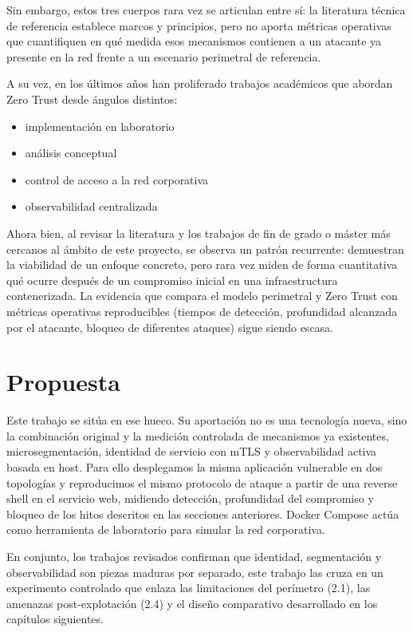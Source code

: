 \documentclass[11pt,spanish,listoffigures,listoftables]{tfgetsinf}
\begin{document}
    Sin embargo, estos tres cuerpos rara vez se articulan entre sí: la literatura técnica de referencia establece marcos y principios, pero no aporta métricas operativas que cuantifiquen en qué medida esos mecanismos contienen a un atacante ya presente en la red frente a un escenario perimetral de referencia.
    
    A su vez, en los últimos años han proliferado trabajos académicos que abordan Zero Trust desde ángulos distintos: 
    \begin{itemize}
        \item implementación en laboratorio
        \item análisis conceptual
        \item control de acceso a la red corporativa
        \item observabilidad centralizada
    \end{itemize}
    
    Ahora bien, al revisar la literatura y los trabajos de fin de grado o máster más cercanos al ámbito de este proyecto, se observa un patrón recurrente: demuestran la viabilidad de un enfoque concreto, pero rara vez miden de forma cuantitativa qué ocurre después de un compromiso inicial en una infraestructura contenerizada. La evidencia que compara el modelo perimetral y Zero Trust con métricas operativas reproducibles (tiempos de detección, profundidad alcanzada por el atacante, bloqueo de diferentes ataques) sigue siendo escasa.
    
    \section{Propuesta}
    Este trabajo se sitúa en ese hueco. Su aportación no es una tecnología nueva, sino la combinación original y la medición controlada de mecanismos ya existentes, microsegmentación, identidad de servicio con mTLS y observabilidad activa basada en host. Para ello desplegamos la misma aplicación vulnerable en dos topologías y reproducimos el mismo protocolo de ataque a partir de una reverse shell en el servicio web, midiendo detección, profundidad del compromiso y bloqueo de los hitos descritos en las secciones anteriores. Docker Compose actúa como herramienta de laboratorio para simular la red corporativa. 
    
    En conjunto, los trabajos revisados confirman que identidad, segmentación y observabilidad son piezas maduras por separado, este trabajo las cruza en un experimento controlado que enlaza las limitaciones del perímetro (2.1), las amenazas post-explotación (2.4) y el diseño comparativo desarrollado en los capítulos siguientes.
\end{document}
